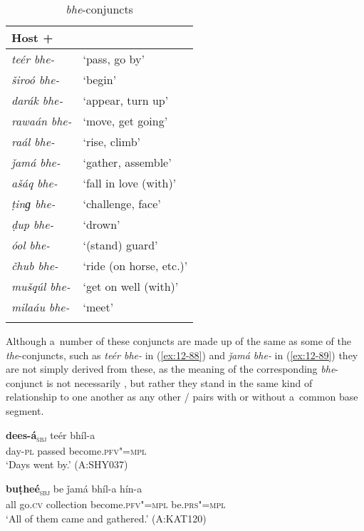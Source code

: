 \begin{exe}
\begin{table}[ht]
\caption{\textit{bhe}-conjuncts}
\begin{tabularx}{.75\textwidth}{ l@{\hspace{45pt}} Q }
\lsptoprule
Host +  &
\\\midrule
\textit{teér bhe-} &
`pass, go by'\\
\textit{široó bhe-} &
`begin'\\
\textit{darák bhe-} &
`appear, turn up'\\
\textit{rawaán bhe-} &
`move, get going'\\
\textit{raál bhe-} &
`rise, climb'\\
\textit{ǰamá bhe-} &
`gather, assemble'\\
\textit{ašáq bhe-} &
`fall in love (with)'\\
\textit{ṭinɡ bhe-} &
`challenge, face'\\
\textit{ḍup bhe-} &
`drown'\\
\textit{óol bhe-} &
`(stand) guard'\\
\textit{čhub bhe-} &
`ride (on horse, etc.)'\\
\textit{mušqúl bhe-} &
`get on well (with)'\\
\textit{milaáu bhe-} &
`meet'\\\lspbottomrule
\end{tabularx}
\label{tab:12-6}
\end{table}


Although a~number of these conjuncts are made up of the same  as some of the \textit{the}-conjuncts, such as \textit{teér bhe-} in (\ref{ex:12-88}) and \textit{ǰamá bhe-} in (\ref{ex:12-89}) they are not simply derived from these, as the meaning of the corresponding \textit{bhe}-conjunct is not necessarily , but rather they stand in the same kind of relationship to one another as any other / pairs with or without a~common base segment.

\begin{exe}
\ex
\label{ex:12-88}
\gll {\ob}\textbf{dees-á}{\cb}\textsubscript{\textsc{\upshape sbj}} teér bhíl-a\\
day-\textsc{pl} passed become.\textsc{pfv"=mpl}\\
\glt `Days went by.' (A:SHY037)
\end{exe}
\begin{exe}
\ex
\label{ex:12-89}
\gll {\ob}\textbf{buṭheé}{\cb}\textsubscript{\textsc{\upshape sbj}} be ǰamá bhíl-a hín-a\\
all go.\textsc{cv} collection become.\textsc{pfv"=mpl} be.\textsc{prs"=mpl} \\
\glt `All of them came and gathered.' (A:KAT120)
\end{exe}


\end{exe}
